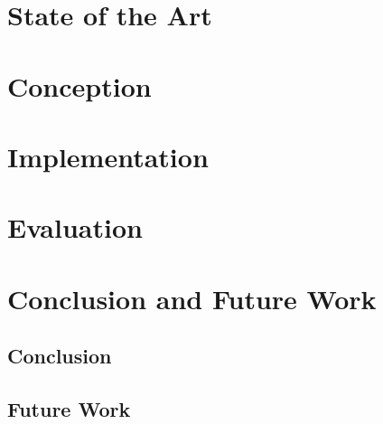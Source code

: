 \documentclass[english, BCOR=6mm, twoside=true, open=right]{tudscrreprt}
\begin{document}
\chapter{State of the Art}\label{chapter:state-of-the-art}



% 

\chapter{Conception}




\chapter{Implementation}



\chapter{Evaluation}



\chapter{Conclusion and Future Work}
\section{Conclusion}
\section{Future Work}


\newpage
{}
\listoffigures

\newpage
{}
\listoftables

\newpage
{}
\lstlistoflistings

\newpage
{}
\printglossary
\end{document}
